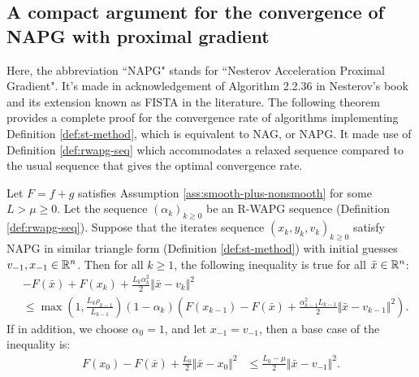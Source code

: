 \documentclass[12pt]{article}
\begin{document}
    \subsection{A compact argument for the convergence of NAPG with proximal gradient}
        Here, the abbreviation ``NAPG" stands for ``Nesterov Acceleration Proximal Gradient". 
        It's made in acknowledgement of Algorithm 2.2.36 in Nesterov's book \cite{nesterov_lectures_2018} and its extension known as FISTA in the literature.
        The following theorem provides a complete proof for the convergence rate of algorithms implementing Definition \ref{def:st-method}, which is equivalent to NAG, or NAPG. 
        It made use of Definition \ref{def:rwapg-seq} which accommodates a relaxed sequence compared to the usual sequence that gives the optimal convergence rate. 
        \begin{theorem}\label{thm:onestep-napg-cnvg}
            Let $F = f + g$ satisfies Assumption \ref{ass:smooth-plus-nonsmooth} for some $L > \mu \ge 0$. 
            Let the sequence $(\alpha_k)_{k \ge0}$ be an R-WAPG sequence (Definition \ref{def:rwapg-seq}). 
            Suppose that the iterates sequence $(x_k, y_k, v_k)_{k \ge 0}$ satisfy NAPG in similar triangle form (Definition \ref{def:st-method}) with initial guesses $v_{-1}, x_{-1} \in \mathbb R^n$. 
            Then for all $k \ge 1$, the following inequality is true for all $\bar x \in \mathbb R^n$: 
            \begin{align*}
                & - F(\bar x) + F(x_k) + \frac{L_k\alpha_k^2}{2}\Vert \bar x - v_k\Vert^2 
                \\
                & \le \max\left(1, \frac{L_k\rho_{k - 1}}{L_{k - 1}}\right)(1 - \alpha_k)\left(
                    F(x_{k - 1}) - F(\bar x) 
                    + \frac{\alpha_{k - 1}^2L_{k - 1}}{2}\Vert \bar x - v_{k - 1}\Vert^2
                \right). 
            \end{align*}
            If in addition, we choose $\alpha_0 = 1$, and let $x_{-1} = v_{-1}$, then a base case of the inequality is: 
            \begin{align*}
                F(x_{0}) - F(\bar x) + \frac{L_0}{2}\Vert \bar x - x_{0}\Vert^2 
                &\le \frac{L_0 - \mu}{2}\Vert \bar x - v_{-1}\Vert^2. 
            \end{align*}
        \end{theorem}
\end{document}
